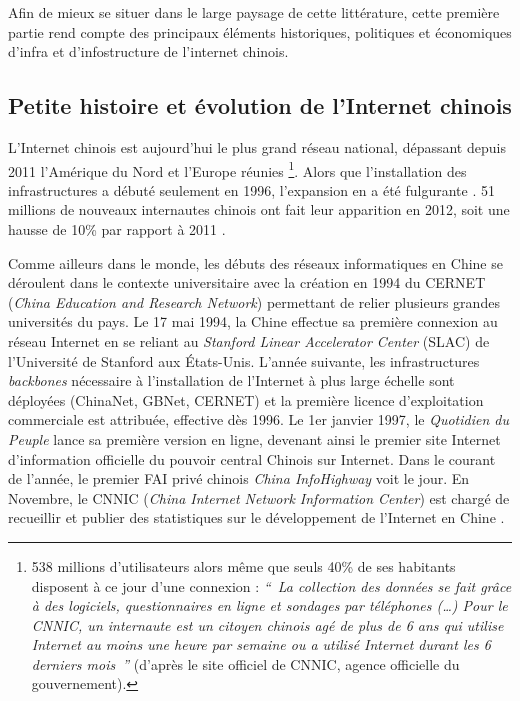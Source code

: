Afin de mieux se situer dans le large paysage de cette littérature, cette première partie rend compte des principaux éléments historiques, politiques et économiques d’infra et d’infostructure de l’internet chinois.

\subsection[Petite histoire et évolution de l’Internet chinois]{Petite histoire et évolution de l’Internet chinois}

L’Internet chinois est aujourd’hui le plus grand réseau national, dépassant depuis 2011 l’Amérique du Nord et l’Europe réunies \citep{CNNIC2013}\footnote{538 millions d'utilisateurs alors même que seuls 40\% de ses habitants disposent à ce jour d’une connexion : \textit{`` La collection des données se fait grâce à des logiciels, questionnaires en ligne et sondages par téléphones (…) Pour le CNNIC, un internaute est un citoyen chinois agé de plus de 6 ans qui utilise Internet au moins une heure par semaine ou a utilisé Internet durant les 6 derniers mois ''} (d’après le site officiel de CNNIC, agence officielle du gouvernement).}. Alors que l’installation des infrastructures a débuté seulement en 1996, l’expansion en a été fulgurante \citep{Fang2006}. 51 millions de nouveaux internautes chinois ont fait leur apparition en 2012, soit une hausse de 10\% par rapport à 2011 \citep{CNNIC2013}. 

Comme ailleurs dans le monde, les débuts des réseaux informatiques en Chine se déroulent dans le contexte universitaire avec la création en 1994 du CERNET (\textit{China Education and Research Network}) permettant de relier plusieurs grandes universités du pays. Le 17 mai 1994, la Chine effectue sa première connexion au réseau Internet en se reliant au \textit{Stanford Linear Accelerator Center} (SLAC) de l’Université de Stanford aux États-Unis. L’année suivante, les infrastructures \textit{backbones} nécessaire à l’installation de l’Internet à plus large échelle sont déployées (ChinaNet, GBNet, CERNET) et la première licence d’exploitation commerciale est attribuée, effective dès 1996. Le 1er janvier 1997, le \textit{Quotidien du Peuple} lance sa première version en ligne, devenant ainsi le premier site Internet d’information officielle du pouvoir central Chinois sur Internet. Dans le courant de l’année, le premier FAI privé chinois \textit{China InfoHighway} voit le jour. En Novembre, le CNNIC (\textit{China Internet Network Information Center}) est chargé de recueillir et publier des statistiques sur le développement de l’Internet en Chine \citep{Dai2007}.

